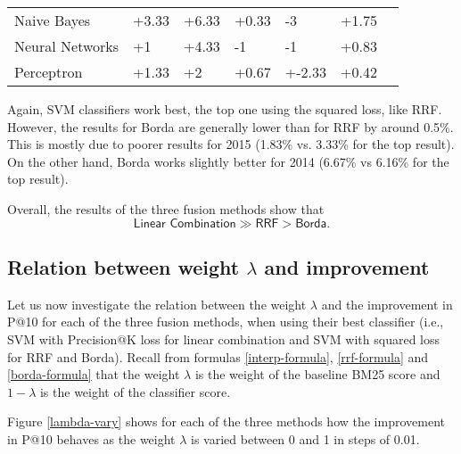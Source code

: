 \begin{table}[h!]
{\begin{tabular}{@{}lllllll@{}}
Naive Bayes                                              & +3.33           & +6.33              & +0.33           & -3                & +1.75          \\
Neural Networks                                         & +1              & +4.33              & -1             & -1                & +0.83          \\
Perceptron                                              & +1.33           & +2                 & +0.67           & +-2.33             & +0.42         \\\bottomrule
\end{tabular}%
}
\end{table}

Again, SVM classifiers work best, the top one using the squared loss, like RRF. 
However, the results for Borda are generally lower than for RRF by around 0.5\%. This is mostly due
to poorer results for 2015 (1.83\% vs. 3.33\% for the top result).
On the other hand, Borda works slightly better for 2014 (6.67\% vs 6.16\% for the top result).

Overall, the results of the three fusion methods show that \[\textsf{Linear Combination} \gg \textsf{RRF} > \textsf{Borda}.\]

\subsection{Relation between weight $\lambda$ and improvement}
Let us now investigate the relation between the weight $\lambda$ and the improvement in P@10 for each of the three
fusion methods, when using their best classifier (i.e., SVM with Precision@K loss for linear combination
and SVM with squared loss for RRF and Borda).
Recall from formulas \ref{interp-formula}, \ref{rrf-formula} and \ref{borda-formula} that the weight $\lambda$ is the 
weight of the baseline BM25 score and $1-\lambda$ is the weight of the classifier score.

Figure \ref{lambda-vary} shows for each of the three methods
how the improvement in P@10 behaves as the weight $\lambda$ is varied between 0 and 1 in steps of 0.01.

